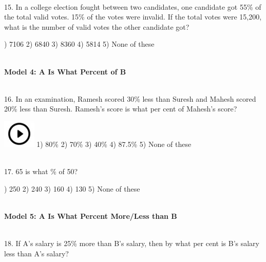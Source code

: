 \documentclass{article}
\begin{document}
\noindent 

\noindent 

\noindent 

\noindent \\ 15. In a college election fought between two candidates, one candidate got 55\% of the total valid votes. 15\% of the votes were invalid. If the total votes were 15,200, what is the number of valid votes the other candidate got?

) 7106                    2) 6840             3) 8360             4) 5814             5) None of these

\noindent 

\noindent 

\noindent 

\noindent 

\noindent \textbf{\\ Model 4: A Is What Percent of B \\}

\noindent 

\noindent \\ 16. In an examination, Ramesh scored 30\% less than Suresh and Mahesh scored 20\% less than Suresh. Ramesh's score is what per cent of Mahesh's score?

\noindent \includegraphics*[width=0.61in, height=0.52in]{images/image1} 1) 80\%                    2) 70\%              3) 40\%              4) 87.5\%           5) None of these

\noindent 

\noindent \\ 17. 65 is what \% of 50?

\noindent 

) 250                      2) 240               3) 160               4) 130               5) None of these

\noindent 

\noindent 

\noindent 

\noindent 

\noindent \textbf{\\ Model 5: A Is What Percent More/Less than B \\}

\noindent 

\noindent \\ 18. If A's salary is 25\% more than B's salary, then by what per cent is B's salary less than A's salary?
\end{document}
